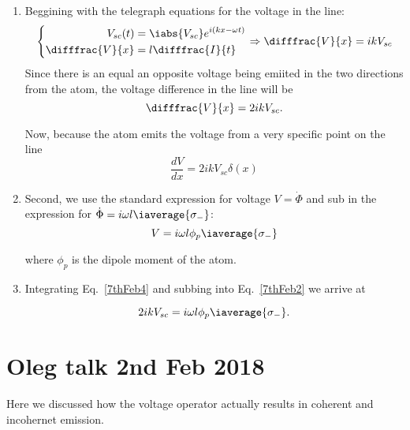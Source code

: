  \begin{enumerate}
 	\item Beggining with the telegraph equations for the voltage in the line:
 	\begin{equation}\label{7thFeb1}
 		\left\lbrace\begin{aligned}
	 		V_{sc}(t) &= \iabs{V_{sc}}e^{i(kx - \omega t)}\\
	 		\difffrac{V}{x} & = l\difffrac{I}{t}
 		\end{aligned}\right. \Rightarrow \difffrac{V}{x} = ikV_{sc}
 	\end{equation}
 	Since there is an equal an opposite voltage being emiited in the two directions from the atom, the voltage difference in the line will be
 	\begin{equation}\label{7thFeb3}
 		\difffrac{V}{x} = 2ikV_{sc}.
 	\end{equation}
 	
 	Now, because the atom emits the voltage from a very specific point on the line 
 	\begin{equation}\label{7thFeb4}
 	\frac{dV}{dx} = 2ikV_{sc}\delta(x)
 	\end{equation}
 	
	\item Second, we use the standard expression for voltage $ V = \dot{\Phi} $ and sub in the expression for $ \dot{\Phi} = i\omega l \iaverage{\sigma_{-}}$:
	\begin{equation}\label{7thFeb2}
		V  = {i\omega l \phi_p\iaverage{\sigma_{-}}}
	\end{equation} 
	
	\noindent where $ \phi_p $ is the dipole moment of the atom.
	
	\item Integrating Eq.~\eqref{7thFeb4} and subbing into Eq.~\eqref{7thFeb2} we arrive at
	
	\begin{equation}\label{7thFev5}
		2ikV_{sc} = i\omega l\phi_p\iaverage{\sigma_{-}}.
	\end{equation}
	
\end{enumerate}
 
 
\newpage
\section{Oleg talk 2nd Feb 2018}
 Here we discussed how the voltage operator actually results in coherent and incohernet emission.
 
